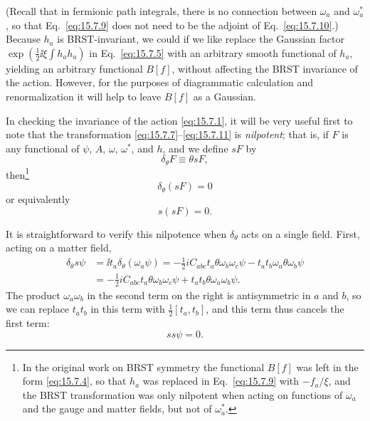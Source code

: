 (Recall that in fermionic path integrals, there is no connection between $\omega_a$ and $\omega_a^*$, so that Eq.~\eqref{eq:15.7.9} does not need to be the adjoint of Eq.~\eqref{eq:15.7.10}.) Because $h_a$ is BRST-invariant, we could if we like replace the Gaussian factor $\exp(\tfrac{1}{2}\ii\xi\int h_a h_a)$ in Eq.~\eqref{eq:15.7.5} with an arbitrary smooth functional of $h_a$, yielding an arbitrary functional $B[f]$, without affecting the BRST invariance of the action. However, for the purposes of diagrammatic calculation and renormalization it will help to leave $B[f]$ as a Gaussian.

In checking the invariance of the action \eqref{eq:15.7.1}, it will be very useful first to note that the transformation \eqref{eq:15.7.7}--\eqref{eq:15.7.11} is \emph{nilpotent}; that is, if $F$ is any functional of $\psi$, $A$, $\omega$, $\omega^*$, and $h$, and we define $sF$ by
\begin{equation}
 \delta_\theta F\equiv\theta sF,
 \tag{15.7.12}\label{eq:15.7.12}
\end{equation}
then\footnote{In the original work on BRST symmetry the functional $B[f]$ was left in the form \eqref{eq:15.7.4}, so that $h_a$ was replaced in Eq.~\eqref{eq:15.7.9} with $-f_a/\xi$, and the BRST transformation was only nilpotent when acting on functions of $\omega_a$ and the gauge and matter fields, but not of $\omega_a^*$.}
\begin{equation}
 \delta_\theta(sF)=0
 \tag{15.7.13}\label{eq:15.7.13}
\end{equation}
or equivalently
\begin{equation}
 s(sF)=0.
 \tag{15.7.14}\label{eq:15.7.14}
\end{equation}

It is straightforward to verify this nilpotence when $\delta_\theta$ acts on a single field. First, acting on a matter field,
\begin{align*}
 \delta_\theta s\psi
 &=\ii t_a\delta_\theta(\omega_a\psi)
 =-\frac{1}{2}iC_{abc}t_a\theta\omega_b\omega_c\psi
 -t_a t_b\omega_a\theta\omega_b\psi\\
 &=-\frac{1}{2}iC_{abc}t_a\theta\omega_b\omega_c\psi
 +t_a t_b\theta\omega_a\omega_b\psi.
\end{align*}
The product $\omega_a\omega_b$ in the second term on the right is antisymmetric in $a$ and $b$, so we can replace $t_a t_b$ in this term with $\tfrac{1}{2}[t_a,t_b]$, and this term thus cancels the first term:
\begin{equation}
 ss\psi=0.
 \tag{15.7.15}\label{eq:15.7.15}
\end{equation}

